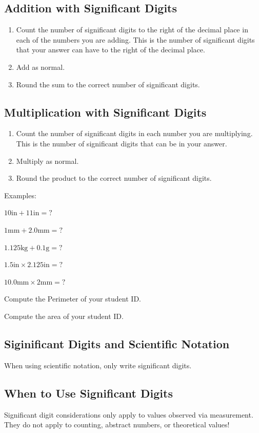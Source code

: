 \documentclass{article}
\begin{document}
\subsection{Addition with Significant Digits}
\begin{enumerate}
    \item Count the number of significant digits to the right of the decimal place in each of the numbers you are adding. This is the number of significant digits that your answer can have to the right of the decimal place.
    \item Add as normal.
    \item Round the sum to the correct number of significant digits.
\end{enumerate}
\subsection{Multiplication with Significant Digits}
\begin{enumerate}
    \item Count the number of significant digits in each number you are multiplying. This is the number of significant digits that can be in your answer.
    \item Multiply as normal.
    \item Round the product to the correct number of significant digits.
\end{enumerate}
Examples: \newline 
\begin{enumerate*}[label=\ \ (\alph*)]
    \item $10\mathrm{in} + 11\mathrm{in} = ?$
    \item $1\mathrm{mm} + 2.0\mathrm{mm} = ?$ 
    \item $1.125\mathrm{kg} + 0.1\mathrm{g} = ?$
    \item $1.5\mathrm{in} \times 2.125\mathrm{in} = ?$ \newline
    \item $10.0\mathrm{mm} \times 2\mathrm{mm} = ?$
    \item Compute the Perimeter of your student ID.\newline
    \item Compute the area of your student ID.
\end{enumerate*}

\subsection{Siginificant Digits and Scientific Notation}
When using scientific notation, only write significant digits.

\subsection{When to Use Significant Digits}
Significant digit considerations only apply to values observed via measurement.  They do not apply to counting, abstract numbers, or theoretical values!
\end{document}
